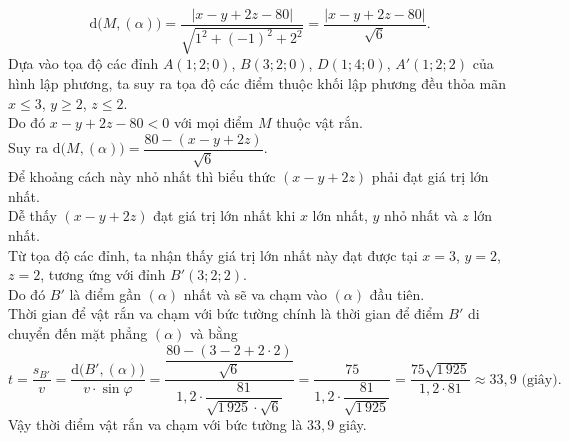 \begin{ex}
{		\[\mathrm{d}\big(M, (\alpha)\big) = \dfrac{|x-y+2z-80|}{\sqrt{1^2+(-1)^2+2^2}} = \dfrac{|x-y+2z-80|}{\sqrt{6}}.\]
		Dựa vào tọa độ các đỉnh $A(1;2;0)$, $B(3;2;0)$, $D(1;4;0)$, $A'(1;2;2)$ của hình lập phương, ta suy ra tọa độ các điểm thuộc khối lập phương đều thỏa mãn $x \le 3$, $y \ge 2$, $z \le 2$.\\
		Do đó $x-y+2z-80 < 0$ với mọi điểm $M$ thuộc vật rắn.\\
		Suy ra $\mathrm{d}\big(M, (\alpha)\big) = \dfrac{80-(x-y+2z)}{\sqrt{6}}$.\\
		Để khoảng cách này nhỏ nhất thì biểu thức $(x-y+2z)$ phải đạt giá trị lớn nhất.\\
		Dễ thấy $(x-y+2z)$ đạt giá trị lớn nhất khi $x$ lớn nhất, $y$ nhỏ nhất và $z$ lớn nhất. \\
		Từ tọa độ các đỉnh, ta nhận thấy giá trị lớn nhất này đạt được tại $x=3$, $y=2$, $z=2$, tương ứng với đỉnh $B'(3;2;2)$. \\
		Do đó $B'$ là điểm gần $(\alpha)$ nhất và sẽ va chạm vào $(\alpha)$ đầu tiên.\\
		Thời gian để vật rắn va chạm với bức tường chính là thời gian để điểm $B'$ di chuyển đến mặt phẳng $(\alpha)$ và bằng
		\[t = \dfrac{s_{B'}}{v} = \dfrac{\mathrm{d}\big(B', (\alpha)\big)}{v\cdot \sin \varphi} = \dfrac{\dfrac{80-(3-2+2\cdot 2)}{\sqrt{6}}}{1{,}2\cdot \dfrac{81}{\sqrt{1\,925}\cdot \sqrt{6}}} = \dfrac{75}{1{,}2\cdot \dfrac{81}{\sqrt{1\,925}}} = \dfrac{75\sqrt{1\,925}}{1{,}2\cdot 81} \approx 33{,}9\text{ (giây)}.\]
		Vậy thời điểm vật rắn va chạm với bức tường là $33{,}9$ giây.
	}
\end{ex}

